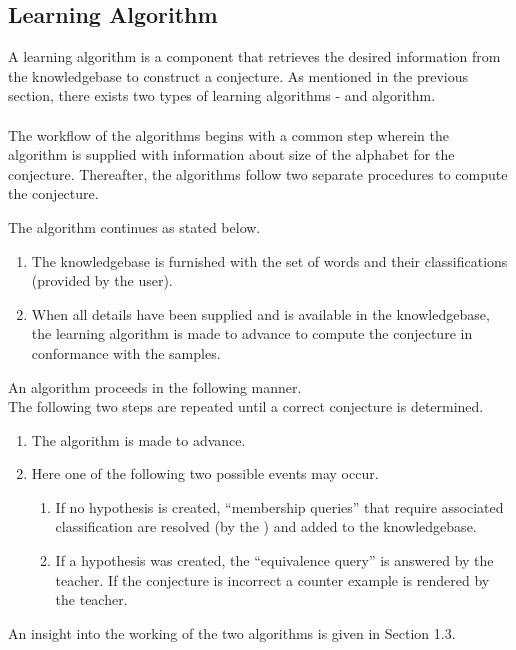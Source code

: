 \subsection{Learning Algorithm}
	A learning algorithm is a component that retrieves the desired information from the knowledgebase to construct a conjecture. As mentioned in the previous section, there exists two types of learning algorithms - \offline and \online algorithm. 
	\paragraph{}
	The workflow of the algorithms begins with a common step wherein the algorithm is supplied with information about size of the alphabet for the conjecture. Thereafter, the algorithms follow two separate procedures to compute the conjecture.
	
	The \offline algorithm continues as stated below.
\begin{enumerate}
	\item The knowledgebase is furnished with the set of words and their classifications (provided by the user).
	\item When all details have been supplied and is available in the knowledgebase, the learning algorithm is made to advance to 	compute the conjecture in conformance with the samples.
\end{enumerate}

	An \online algorithm proceeds in the following manner. \\
	The following two steps are repeated until a correct conjecture is determined.
\begin{enumerate}
\item The algorithm is made to advance.
\item Here one of the following two possible events may occur.
\begin{enumerate}
\item If no hypothesis is created, ``membership queries'' that require associated classification are resolved (by the \teacher) and added to the knowledgebase.
\item If a hypothesis was created, the ``equivalence query'' is answered by the teacher. If the conjecture is incorrect a counter example is rendered by the teacher.
\end{enumerate}
\end{enumerate}	
	
An insight into the working of the two algorithms is given in Section 1.3.
	

